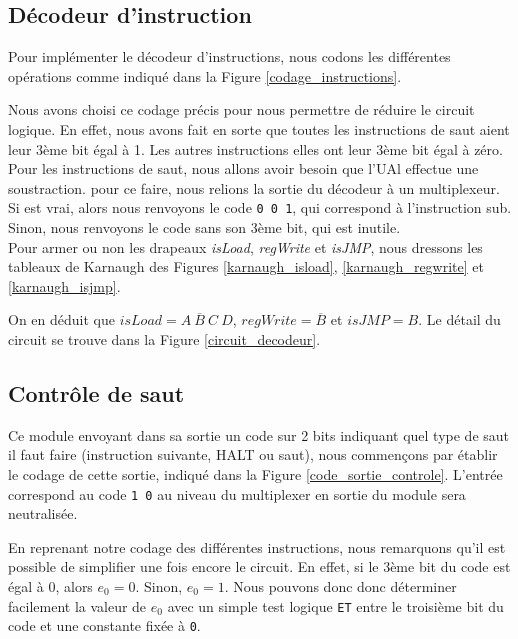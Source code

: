 \documentclass[10pt,a4paper]{article}
\begin{document}
\subsection{Décodeur d'instruction}

Pour implémenter le décodeur d'instructions, nous codons les différentes opérations comme indiqué dans la Figure \ref{codage_instructions}.

Nous avons choisi ce codage précis pour nous permettre de réduire le circuit logique. En effet, nous avons fait en sorte que toutes les instructions de saut aient leur 3ème bit égal à 1. Les autres instructions elles ont leur 3ème bit égal à zéro. \\

Pour les instructions de saut, nous allons avoir besoin que l'UAl effectue une soustraction. pour ce faire, nous relions la sortie du décodeur à un multiplexeur. Si  est vrai, alors nous renvoyons le code \verb|0 0 1|, qui correspond à l'instruction sub. Sinon, nous renvoyons le code sans son 3ème bit, qui est inutile. \\

Pour armer ou non les drapeaux \textit{isLoad}, \textit{regWrite} et \textit{isJMP}, nous dressons les tableaux de Karnaugh des Figures \ref{karnaugh_isload}, \ref{karnaugh_regwrite} et \ref{karnaugh_isjmp}.

On en déduit que $isLoad = A~\overline{B}~C~D$, $regWrite = \overline{B}$ et $isJMP = B$. Le détail du circuit se trouve dans la Figure \ref{circuit_decodeur}.

\subsection{Contrôle de saut}

Ce module envoyant dans sa sortie un code sur 2 bits indiquant quel type de saut il faut faire (instruction suivante, HALT ou saut), nous commençons par établir le codage de cette sortie, indiqué dans la Figure \ref{code_sortie_controle}. L'entrée correspond au code \verb|1 0| au niveau du multiplexer en sortie du module sera neutralisée.

En reprenant notre codage des différentes instructions, nous remarquons qu'il est possible de simplifier une fois encore le circuit. En effet, si le 3ème bit du code est égal à 0, alors $e_0 = 0$. Sinon, $e_0 = 1$. Nous pouvons donc donc déterminer facilement la valeur de $e_0$ avec un simple test logique \verb|ET| entre le troisième bit du code et une constante fixée à \verb|0|. \\
\end{document}
